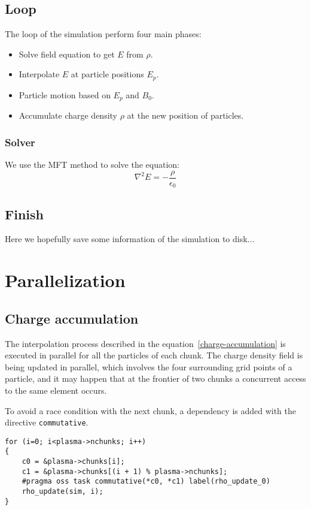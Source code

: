 \subsection{Loop}

The loop of the simulation perform four main phases:

\begin{itemize}
\item Solve field equation to get $E$ from $\rho$.
\item Interpolate $E$ at particle positions $E_p$.
\item Particle motion based on $E_p$ and $B_0$.
\item Accumulate charge density $\rho$ at the new position of particles.
\end{itemize}

\subsubsection{Solver}

We use the MFT method to solve the equation:
\begin{equation}
\nabla^2 E = - \frac{\rho}{\epsilon_0}
\end{equation}

\subsection{Finish}

Here we hopefully save some information of the simulation to disk...

\section{Parallelization}

\subsection{Charge accumulation}

The interpolation process described in the equation~\ref{charge-accumulation} is 
executed in parallel for all the particles of each chunk. The charge density 
field is being updated in parallel, which involves the four surrounding grid 
points of a particle, and it may happen that at the frontier of two chunks a 
concurrent access to the same element occurs.

To avoid a race condition with the next chunk, a dependency is added with the 
directive \texttt{commutative}.

\begin{lstlisting}[caption={Task to update $\rho$ field using the 
\texttt{commutative} directive}, captionpos=b]
for (i=0; i<plasma->nchunks; i++)
{
	c0 = &plasma->chunks[i];
	c1 = &plasma->chunks[(i + 1) % plasma->nchunks];
	#pragma oss task commutative(*c0, *c1) label(rho_update_0)
	rho_update(sim, i);
}

\end{lstlisting}

